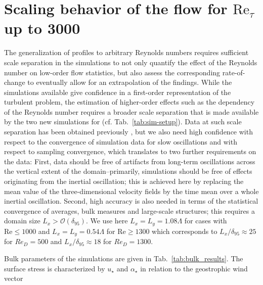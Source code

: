 \documentclass[a4paper,11pt]{amsart}
\newcommand{\RE}{\mathrm{Re}}
\begin{document}
\section{Scaling behavior of the flow for $\RE_\tau$ up to 3000}
\label{sec:scaling}
%
The generalization of profiles to arbitrary Reynolds numbers 
requires sufficient scale separation in the simulations to not only quantify the effect of
the Reynolds number on low-order flow statistics, but also assess the corresponding rate-of-change
to eventually allow for an extrapolation of the findings.
%
While the simulations available give confidence in a first-order representation of the turbulent
problem, the estimation of higher-order effects such as the dependency of the Reynolds number requires
a broader scale separation that is made available by the two new simulations for 
(cf. Tab.~\ref{tab:sim-setup}). 
%
%
Data at such scale separation has been obtained previously \citep[cf.][]{spalart:PF2008,spalart:PF2009}, 
but we also need high confidence with respect to the convergence of simulation data for slow oscillations 
and with respect to sampling convergence, which translates to two further requirements on the data: 
%
First, data should be free of artifacts from long-term oscillations across the vertical
extent of the domain--primarily, simulations should be free of effects originating from the
inertial oscillation; this is achieved here by replacing the mean value of the three-dimensional
velocity fields by the time mean over a whole inertial oscillation. 
%
Second, high accuracy is also needed in terms of the statistical convergence of averages,
bulk measures and large-scale structures; this requires a domain size $L_{x} > \mathcal{O}(\delta_{95})$. 
%
We use here $L_{x}=L_{y}=1.08\Lambda$ for cases with $\RE \le 1000$ and
$L_{x}=L_{y}=0.54\Lambda$ for $\RE \ge 1300$ which corresponds to $L_{x}/\delta_{95}\approx 25$ for $Re_D=500$
and $L_{x}/\delta_{95} \approx 18$ for $Re_D=1300$.
%
\par
%
Bulk parameters of the simulations are given in Tab.~\ref{tab:bulk_results}.
%
The surface stress is characterized by $u_\star$ and $\alpha_\star$ in relation to the geostrophic wind vector
\end{document}
